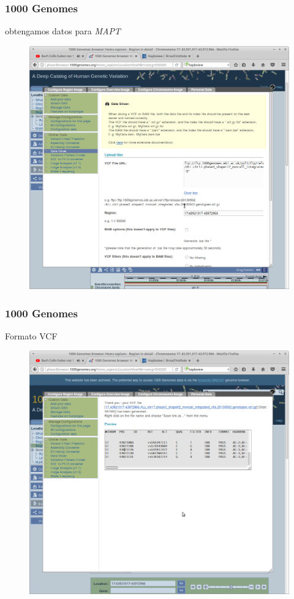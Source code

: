 \documentclass{beamer}\usepackage[]{graphicx}\usepackage[]{color}
\begin{document}
\begin{frame}[fragile]
\frametitle{1000 Genomes}
obtengamos datos para \emph{MAPT}
\begin{figure}[htbp]
\begin{center}
\includegraphics[width=.7\linewidth]{getvcf.png}
\end{center}
\end{figure}
\end{frame}


\begin{frame}[fragile]
\frametitle{1000 Genomes}
Formato VCF
\begin{figure}[htbp]
\begin{center}
\includegraphics[width=.7\linewidth]{vcf1.png}
\end{center}
\end{figure}

\end{frame}
\end{document}
